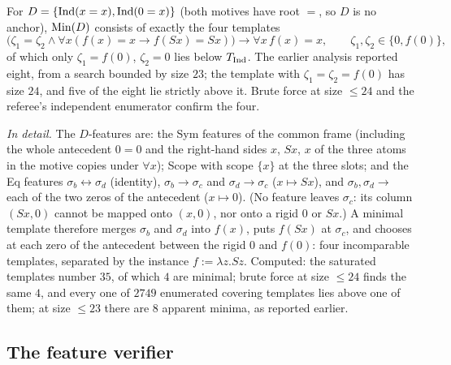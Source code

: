 \begin{example}\label{ex:single:c82}
For $D=\{\mathrm{Ind}(x=x),\mathrm{Ind}(0=x)\}$ (both motives have root $=$, so $D$ is no anchor), $\mathrm{Min}(D)$ consists of exactly the four templates
\[
\bigl(\zeta_1=\zeta_2\wedge\forall x(f(x)=x\to f(Sx)=Sx)\bigr)\to\forall x\,f(x)=x,\qquad\zeta_1,\zeta_2\in\{0,f(0)\},
\]
of which only $\zeta_1=f(0)$, $\zeta_2=0$ lies below $T_{\mathrm{Ind}}$. The earlier analysis reported eight, from a search bounded by size $23$; the template with $\zeta_1=\zeta_2=f(0)$ has size $24$, and five of the eight lie strictly above it. Brute force at size $\le24$ and the referee's independent enumerator confirm the four.
\end{example}

\noindent\emph{In detail.} The $D$-features are: the Sym features of the common frame (including the whole antecedent $0=0$ and the right-hand sides $x$, $Sx$, $x$ of the three atoms in the motive copies under $\forall x$); Scope with scope $\{x\}$ at the three slots; and the Eq features $\sigma_b\leftrightarrow\sigma_d$ (identity), $\sigma_b\to\sigma_c$ and $\sigma_d\to\sigma_c$ ($x\mapsto Sx$), and $\sigma_b,\sigma_d\to$ each of the two zeros of the antecedent ($x\mapsto0$). (No feature leaves $\sigma_c$: its column $(Sx,0)$ cannot be mapped onto $(x,0)$, nor onto a rigid $0$ or $Sx$.) A minimal template therefore merges $\sigma_b$ and $\sigma_d$ into $f(x)$, puts $f(Sx)$ at $\sigma_c$, and chooses at each zero of the antecedent between the rigid $0$ and $f(0)$: four incomparable templates, separated by the instance $f:=\lambda z.Sz$. Computed: the saturated templates number $35$, of which $4$ are minimal; brute force at size $\le24$ finds the same $4$, and every one of $2749$ enumerated covering templates lies above one of them; at size $\le23$ there are $8$ apparent minima, as reported earlier.

\subsection{The feature verifier}\label{app:single:feat}

